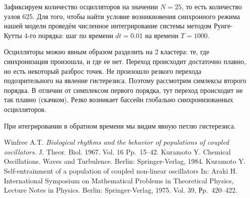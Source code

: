 Зафиксируем количество осцилляторов на значении $N=25$, то есть количество узлов 625.
Для того, чтобы найти условие возникновения синхронного режима нашей модели проведём численное интегрирование системы методом Рунге-Кутты 4-го порядка: шаг по времени $dt=0.01$ на времени $T=1000$.

Осцилляторы можно явным образом разделить на 2 кластера: те, где синхронизация произошла, и где ее нет. Переход происходит достаточно плавно, но есть некоторый разброс точек. Не произошло резкого перехода подозрительного на явление гистерезиса. Поэтому рассмотрим симлексы второго порядка.
В отличии от симплексом первого порядка, тут переход происходит не так плавно (скачком). Резко возникает бассейн глобально синхронизованных осцилляторов. 

При итегрировании в обратном времени мы видим явную петлю гистерезиса.



\begin{thebibliography}{99}
 Winfree A.T.  {\it Biological rhythms and the behavior of populations of coupled oscillators}.   J. Theor. Biol. 1967. Vol. 16  Pp.~15--42.
Kuramoto Y. Chemical Oscillations. Waves and Turbulence. Berlin: Springer-Verlag, 1984.
 Kuramoto Y. {   Self-entrainment of a population of coupled non-linear oscillators In: Araki H}. International Symposium on Mathematical Problems in Theoretical Physics, Lecture Notes in Physics. Berlin: Springer-Verlag, 1975. Vol. 39, Рp.~420--422.
\end{thebibliography}





%

